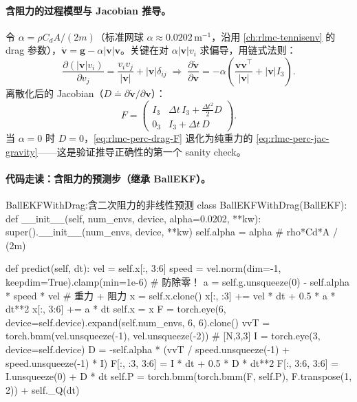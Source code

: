 \paragraph{含阻力的过程模型与 Jacobian 推导。}令 $\alpha=\rho C_d A/(2m)$（标准网球 $\alpha\approx 0.0202$\,m$^{-1}$，沿用 \cref{ch:rlmc-tennisenv} 的 drag 参数），$\dot{\mathbf v}=\mathbf g-\alpha|\mathbf v|\mathbf v$。关键在对 $\alpha|\mathbf v|v_i$ 求偏导，用链式法则：
\begin{equation}
\frac{\partial(|\mathbf v|v_i)}{\partial v_j}=\frac{v_iv_j}{|\mathbf v|}+|\mathbf v|\delta_{ij}
\;\Rightarrow\;
\frac{\partial\dot{\mathbf v}}{\partial\mathbf v}=-\alpha\!\left(\frac{\mathbf v\mathbf v^{\!\top}}{|\mathbf v|}+|\mathbf v|I_3\right).
\label{eq:rlmc-perc-drag-jac}
\end{equation}
离散化后的 Jacobian（$D\doteq\partial\dot{\mathbf v}/\partial\mathbf v$）：
\begin{equation}
F=\begin{pmatrix} I_3 & \Delta t\,I_3+\tfrac{\Delta t^2}{2}D\\[2pt] 0_3 & I_3+\Delta t\,D\end{pmatrix}.
\label{eq:rlmc-perc-drag-F}
\end{equation}
当 $\alpha=0$ 时 $D=0$，\eqref{eq:rlmc-perc-drag-F} 退化为纯重力的 \eqref{eq:rlmc-perc-jac-gravity}——这是验证推导正确性的第一个 sanity check。

\paragraph{代码走读：含阻力的预测步（继承 BallEKF）。}

\begin{codebox}[Python]{BallEKFWithDrag:含二次阻力的非线性预测}
class BallEKFWithDrag(BallEKF):
    def __init__(self, num_envs, device, alpha=0.0202, **kw):
        super().__init__(num_envs, device, **kw)
        self.alpha = alpha                                  # rho*Cd*A / (2m)

    def predict(self, dt):
        vel = self.x[:, 3:6]
        speed = vel.norm(dim=-1, keepdim=True).clamp(min=1e-6)   # 防除零！
        a = self.g.unsqueeze(0) - self.alpha * speed * vel        # 重力 + 阻力
        x = self.x.clone()
        x[:, :3] += vel * dt + 0.5 * a * dt**2
        x[:, 3:6] += a * dt
        self.x = x
        F = torch.eye(6, device=self.device).expand(self.num_envs, 6, 6).clone()
        vvT = torch.bmm(vel.unsqueeze(-1), vel.unsqueeze(-2))     # [N,3,3]
        I = torch.eye(3, device=self.device)
        D = -self.alpha * (vvT / speed.unsqueeze(-1) + speed.unsqueeze(-1) * I)
        F[:, :3, 3:6] = I * dt + 0.5 * D * dt**2
        F[:, 3:6, 3:6] = I.unsqueeze(0) + D * dt
        self.P = torch.bmm(torch.bmm(F, self.P), F.transpose(1, 2)) + self._Q(dt)
\end{codebox}

